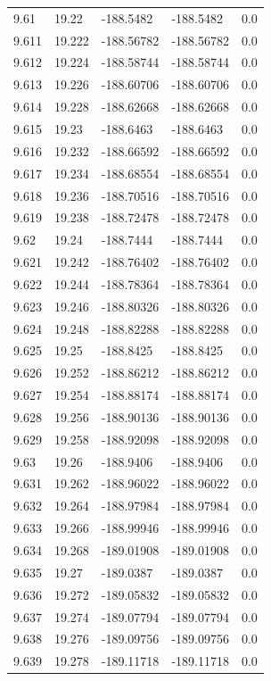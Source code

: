 \begin{tabular}{lllll}
9.61 & 19.22 & -188.5482 & -188.5482 & 0.0 \\
9.611 & 19.222 & -188.56782 & -188.56782 & 0.0 \\
9.612 & 19.224 & -188.58744 & -188.58744 & 0.0 \\
9.613 & 19.226 & -188.60706 & -188.60706 & 0.0 \\
9.614 & 19.228 & -188.62668 & -188.62668 & 0.0 \\
9.615 & 19.23 & -188.6463 & -188.6463 & 0.0 \\
9.616 & 19.232 & -188.66592 & -188.66592 & 0.0 \\
9.617 & 19.234 & -188.68554 & -188.68554 & 0.0 \\
9.618 & 19.236 & -188.70516 & -188.70516 & 0.0 \\
9.619 & 19.238 & -188.72478 & -188.72478 & 0.0 \\
9.62 & 19.24 & -188.7444 & -188.7444 & 0.0 \\
9.621 & 19.242 & -188.76402 & -188.76402 & 0.0 \\
9.622 & 19.244 & -188.78364 & -188.78364 & 0.0 \\
9.623 & 19.246 & -188.80326 & -188.80326 & 0.0 \\
9.624 & 19.248 & -188.82288 & -188.82288 & 0.0 \\
9.625 & 19.25 & -188.8425 & -188.8425 & 0.0 \\
9.626 & 19.252 & -188.86212 & -188.86212 & 0.0 \\
9.627 & 19.254 & -188.88174 & -188.88174 & 0.0 \\
9.628 & 19.256 & -188.90136 & -188.90136 & 0.0 \\
9.629 & 19.258 & -188.92098 & -188.92098 & 0.0 \\
9.63 & 19.26 & -188.9406 & -188.9406 & 0.0 \\
9.631 & 19.262 & -188.96022 & -188.96022 & 0.0 \\
9.632 & 19.264 & -188.97984 & -188.97984 & 0.0 \\
9.633 & 19.266 & -188.99946 & -188.99946 & 0.0 \\
9.634 & 19.268 & -189.01908 & -189.01908 & 0.0 \\
9.635 & 19.27 & -189.0387 & -189.0387 & 0.0 \\
9.636 & 19.272 & -189.05832 & -189.05832 & 0.0 \\
9.637 & 19.274 & -189.07794 & -189.07794 & 0.0 \\
9.638 & 19.276 & -189.09756 & -189.09756 & 0.0 \\
9.639 & 19.278 & -189.11718 & -189.11718 & 0.0 \\

\end{tabular}
